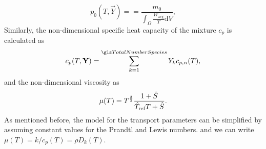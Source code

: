 \begin{equation}
p_0(T, \vec{Y}) == \frac{m_0}{\int_\Omega \frac{W_{\text{avg}}}{T}\text{d}V}, \label{eq:p0Condition}
\end{equation}
Similarly, the non-dimensional specific heat capacity of the mixture $c_p$ is calculated as
\begin{equation}\label{eq:nondim_cpmixture}
c_p(T,\mathbf{Y}) = \SumOvAllns Y_k c_{p,\alpha}(T),
\end{equation}
and the non-dimensional viscosity as
\begin{equation} \label{eq:nondim_sutherland}
\mu(T) =  T^{\frac{3}{2}}\frac{1+\hat{S} }{\hat T_{\text{ref}}T+\hat{S}}.
\end{equation} 
As mentioned before, the model for the transport parameters can be simplified by assuming constant values for the Prandtl and Lewis numbers. \citep{smokeFormulationPremixedNonpremixed1991} and we can write $\mu(T) = k/c_p(T) = \rho D_k(T)$.
